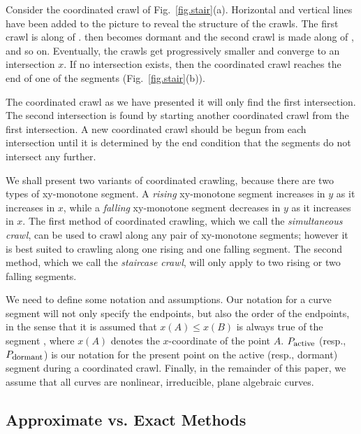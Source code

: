 
\begin{example}
\label{eg1}
Consider the coordinated crawl of Fig.~\ref{fig.stair}(a).
Horizontal and vertical lines have been added to the picture 
to reveal the structure of the crawls.
The first crawl is along  of .
 then becomes dormant and the second crawl is made along  of ,
and so on.
Eventually, the crawls get progressively smaller and converge to an intersection $x$.
If no intersection exists, then the coordinated crawl reaches the end of one 
of the segments (Fig.~\ref{fig.stair}(b)).
\end{example}

The coordinated crawl as we have presented it will only find the first intersection.
The second intersection is found by starting another coordinated crawl from the
first intersection.
A new coordinated crawl should be begun from each intersection 
until it is determined by the end condition that the segments do not intersect any further.

We shall present two variants of coordinated crawling, because there are two types
of xy-monotone segment.
A {\em rising} xy-monotone segment increases in $y$ as it increases in $x$, while
a {\em falling} xy-monotone segment decreases in $y$ as it increases in $x$.
The first method of coordinated crawling, which we call the {\em simultaneous crawl}, 
can be used to 
crawl along any pair of xy-monotone segments;
however it is best suited to crawling along one rising and one falling segment.
The second method, which we call the {\em staircase crawl}, will 
only apply to two rising or two falling 
segments.

We need to define some notation and assumptions.
Our notation for a curve segment will not only specify the endpoints,
but also the order of the endpoints, in the sense that it is assumed that
$x(A) \leq x(B)$ is always true of the segment , where
$x(A)$ denotes the $x$-coordinate of the point $A$.
$P_{\mbox{\footnotesize{active}}}$ (resp., $P_{\mbox{\footnotesize{dormant}}}$)
is our notation for the present point on the active (resp., dormant) segment during 
a coordinated crawl. 
Finally, in the remainder of this paper, we assume that all curves are nonlinear, 
irreducible, plane algebraic curves.

\subsection{Approximate vs. Exact Methods}
\label{sub-exact}


